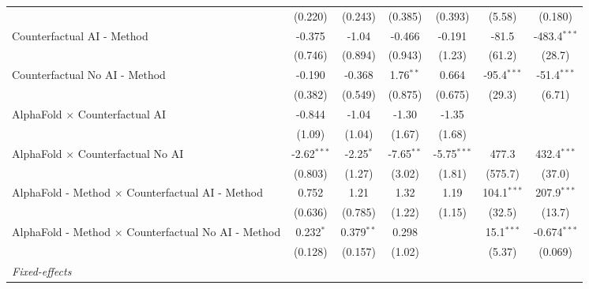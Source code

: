 \begin{tabular}{lcccccc}
                                                              & (0.220)       & (0.243)        & (0.385)      & (0.393)       & (5.58)        & (0.180)\\   
   Counterfactual AI - Method                                 & -0.375        & -1.04          & -0.466       & -0.191        & -81.5         & -483.4$^{***}$\\   
                                                              & (0.746)       & (0.894)        & (0.943)      & (1.23)        & (61.2)        & (28.7)\\   
   Counterfactual No AI - Method                              & -0.190        & -0.368         & 1.76$^{**}$  & 0.664         & -95.4$^{***}$ & -51.4$^{***}$\\   
                                                              & (0.382)       & (0.549)        & (0.875)      & (0.675)       & (29.3)        & (6.71)\\   
   AlphaFold $\times$ Counterfactual AI                       & -0.844        & -1.04          & -1.30        & -1.35         &               &   \\   
                                                              & (1.09)        & (1.04)         & (1.67)       & (1.68)        &               &   \\   
   AlphaFold $\times$ Counterfactual No AI                    & -2.62$^{***}$ & -2.25$^{*}$    & -7.65$^{**}$ & -5.75$^{***}$ & 477.3         & 432.4$^{***}$\\   
                                                              & (0.803)       & (1.27)         & (3.02)       & (1.81)        & (575.7)       & (37.0)\\   
   AlphaFold - Method $\times$ Counterfactual AI - Method     & 0.752         & 1.21           & 1.32         & 1.19          & 104.1$^{***}$ & 207.9$^{***}$\\   
                                                              & (0.636)       & (0.785)        & (1.22)       & (1.15)        & (32.5)        & (13.7)\\   
   AlphaFold - Method $\times$ Counterfactual No AI - Method  & 0.232$^{*}$   & 0.379$^{**}$   & 0.298        &               & 15.1$^{***}$  & -0.674$^{***}$\\   
                                                              & (0.128)       & (0.157)        & (1.02)       &               & (5.37)        & (0.069)\\   
   \midrule
   \emph{Fixed-effects}\\

\end{tabular}
